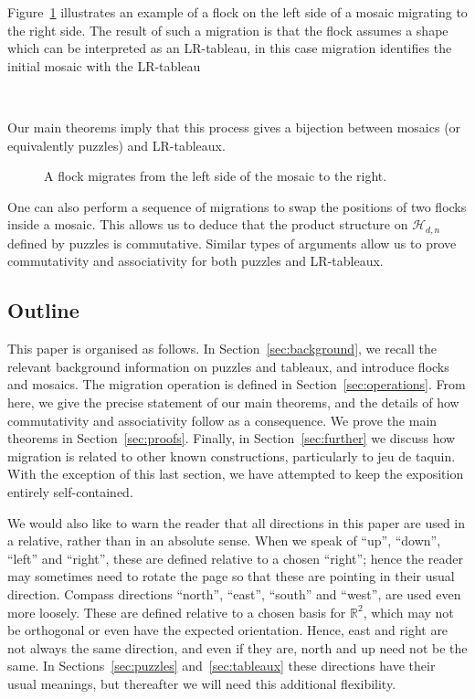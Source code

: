 \documentclass[12pt]{article}
\newcommand{\RR}{\mathbb{R}}
\newcommand{\ringH}{\mathcal{H}_{d,n}}
\begin{document}
Figure~\ref{fig:migrationex} illustrates an example of a flock on
the left side of a mosaic migrating to the right side.
The result of such a migration is that the flock assumes a shape
which can be interpreted as an LR-tableau, in this case migration
identifies the initial mosaic with the LR-tableau \\
\centerline{\ }  
Our main theorems
imply that this process gives a bijection between mosaics 
(or equivalently puzzles) and LR-tableaux. 

%
\begin{figure}[htbp]
\begin{center}
\caption{A flock migrates from the left side of the mosaic to the right.}
\label{fig:migrationex}
\end{center}
\end{figure}
%

One can also perform a sequence of migrations to swap the positions
of two flocks inside a mosaic.  This allows us to deduce that the 
product structure on $\ringH$ defined by puzzles is commutative.
Similar types of arguments allow us to prove commutativity
and associativity for both puzzles and LR-tableaux.  

\subsection{Outline}
This paper is organised as follows.  In Section~\ref{sec:background},
we recall the relevant background information on puzzles and tableaux,
and introduce flocks and mosaics.  The migration operation is defined in 
Section~\ref{sec:operations}.  From here, we give the precise 
statement of our main theorems, and the details of how 
commutativity and associativity follow as a consequence.  We prove
the main theorems in Section~\ref{sec:proofs}.  Finally, in 
Section~\ref{sec:further} we discuss
how migration is related to other known constructions, particularly
to jeu de taquin.  With the exception of this last section, we
have attempted to keep the exposition entirely self-contained.

We would also like to warn the reader that all directions
in this paper are used in a relative, rather than in
an absolute sense.  
When we speak of 
``up'', ``down'', ``left'' and ``right'', these are defined relative 
to a chosen ``right''; hence the reader may sometimes need to rotate
the page so that these are pointing in their usual direction.
Compass directions ``north'', ``east'', ``south'' and
``west'', are used even more loosely.  These are defined relative to 
a chosen basis for $\RR^2$,
which may not be orthogonal or even have the expected orientation.
Hence, east and right are not always 
the same direction, and even if they are, north and up need not be 
the same.  In Sections~\ref{sec:puzzles} and~\ref{sec:tableaux}
these directions have their usual meanings, but thereafter we will
need this additional flexibility.
\end{document}
